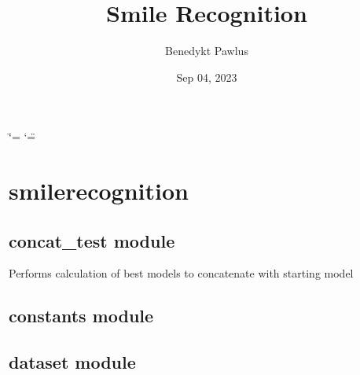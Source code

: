\documentclass[letterpaper,10pt,english]{sphinxmanual}
\title{Smile Recognition}
\date{Sep 04, 2023}
\author{Benedykt Pawlus}
\begin{document}
\ifdefined\shorthandoff
  \ifnum\catcode`\=\string=\active\shorthandoff{=}\fi
  \ifnum\catcode`\"=\active{}\fi
\fi

\pagestyle{empty}
\sphinxmaketitle
\pagestyle{plain}
\sphinxtableofcontents
\pagestyle{normal}
\label{\detokenize{index::doc}}


\sphinxstepscope


\chapter{smilerecognition}
\label{\detokenize{modules:smilerecognition}}\label{\detokenize{modules::doc}}
\sphinxstepscope


\section{concat\_test module}
\label{\detokenize{concat_test:module-concat_test}}\label{\detokenize{concat_test:concat-test-module}}\label{\detokenize{concat_test::doc}}

\begin{fulllineitems}
\label{\detokenize{concat_test:concat_test.main}}
\pysigstartsignatures
{}
\pysigstopsignatures
\sphinxAtStartPar
Performs calculation of best models to concatenate with starting model

\end{fulllineitems}


\sphinxstepscope


\section{constants module}
\label{\detokenize{constants:module-constants}}\label{\detokenize{constants:constants-module}}\label{\detokenize{constants::doc}}
\sphinxstepscope


\section{dataset module}
\label{\detokenize{dataset:module-dataset}}\label{\detokenize{dataset:dataset-module}}\label{\detokenize{dataset::doc}}
\end{document}
